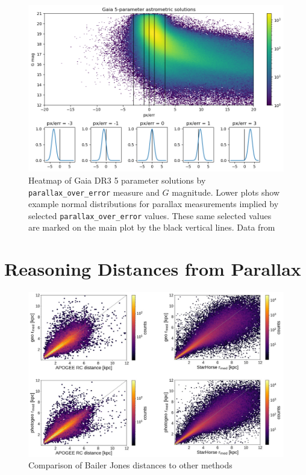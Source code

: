\documentclass[twocolumn]{aastex631}
\begin{document}
\begin{figure}
	\includegraphics[width=\columnwidth]{poe_map.png}
	\caption{Heatmap of Gaia DR3 5 parameter solutions by \texttt{parallax\_over\_error} measure and $G$ magnitude. Lower plots show example normal distributions for parallax measurements implied by selected \texttt{parallax\_over\_error} values. These same selected values are marked on the main plot by the black vertical lines. Data from \cite{collaborationGaia2022}}
	\label{fig:dr3poe}
\end{figure}

\section{Reasoning Distances from Parallax} \label{sec:distance}

\begin{figure}
	\includegraphics[width=0.8\columnwidth]{bailerjonesverification.png}
	\caption{Comparison of Bailer Jones distances to other methods \citep{bailer-jonesEstimating2021}}
	\label{fig:bailerjones}
\end{figure}
\end{document}
